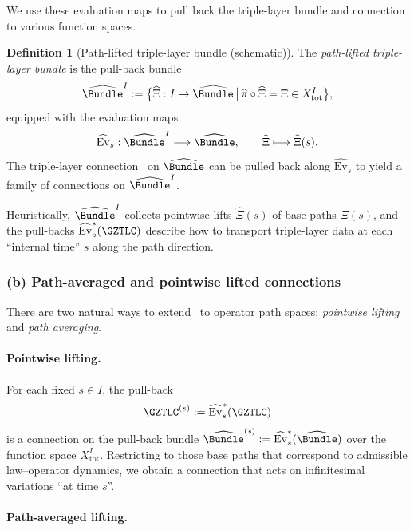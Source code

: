 \documentclass[11pt]{book}
\theoremstyle{plain}
\theoremstyle{definition}
\newtheorem{definition}[theorem]{Definition} \theoremstyle{remark}
\begin{document}
We use these evaluation maps to pull back the triple-layer bundle and
connection to various function spaces.

\begin{definition}[Path-lifted triple-layer bundle (schematic)]
The \emph{path-lifted triple-layer bundle} is the pull-back bundle
  \[
     \widehat{\Bundle}^{I}
     :=
     \bigl\{
       \widehat{\Xi}:I\to\widehat{\Bundle}
       \,\big|\,
       \widehat{\pi}\circ\widehat{\Xi}=\Xi\in X_{\mathrm{tot}}^I
     \bigr\},
  \]
  equipped with the evaluation maps
  \[
     \widehat{\mathrm{Ev}}_s:
       \widehat{\Bundle}^{I}\longrightarrow \widehat{\Bundle},
       \qquad
       \widehat{\Xi}\longmapsto\widehat{\Xi}(s).
  \]
  The triple-layer connection \GZTLC\ on $\widehat{\Bundle}$ can be
  pulled back along $\widehat{\mathrm{Ev}}_s$ to yield a family of
  connections on $\widehat{\Bundle}^I$.
\end{definition}

Heuristically, $\widehat{\Bundle}^{I}$ collects pointwise lifts
$\widehat{\Xi}(s)$ of base paths $\Xi(s)$, and the pull-backs
$\widehat{\mathrm{Ev}}_s^*(\GZTLC)$ describe how to transport triple-layer
data at each “internal time” $s$ along the path direction.



\subsubsection*{(b) Path-averaged and pointwise lifted connections}

There are two natural ways to extend \GZTLC\ to operator path spaces:
\emph{pointwise lifting} and \emph{path averaging}.

\paragraph{Pointwise lifting.}

For each fixed $s\in I$, the pull-back
\[
   \GZTLC^{(s)}
   :=
   \widehat{\mathrm{Ev}}_s^*(\GZTLC)
\]
is a connection on the pull-back bundle
$\widehat{\Bundle}^{(s)}:=\widehat{\mathrm{Ev}}_s^*(\widehat{\Bundle})$
over the function space $X_{\mathrm{tot}}^I$. Restricting to those base
paths that correspond to admissible law–operator dynamics, we obtain a
connection that acts on infinitesimal variations “at time $s$”.

\paragraph{Path-averaged lifting.}
\end{document}
